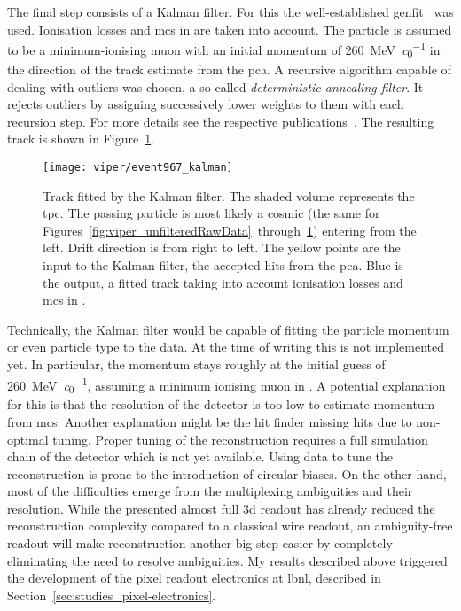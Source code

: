 The final step consists of a Kalman filter.
For this the well-established \gls{genfit}~\cite{genfit1, genfit2} was used.
Ionisation losses and \gls{mcs} in \lar{} are taken into account.
The particle is assumed to be a minimum-ionising muon with an initial momentum of \SI{260}{\mega\electronvolt\per\clight} in the direction of the track estimate from the \gls{pca}.
A recursive algorithm capable of dealing with outliers was chosen, a so-called \emph{deterministic annealing filter}.
It rejects outliers by assigning successively lower weights to them with each recursion step.
For more details see the respective publications~\cite{genfit1, genfit2}.
The resulting track is shown in Figure~\ref{fig:viper_kalman}.

\begin{figure}[htb]
	\centering
	\texttt{[image: viper/event967\_kalman]}
	\caption[Kalman-fitted track of typical pixel demonstrator event]{%
		Track fitted by the Kalman filter.
		The shaded volume represents the \acrshort{tpc}.
		The passing particle is most likely a cosmic \Pgm (the same for Figures~\ref{fig:viper_unfilteredRawData}~through~\ref{fig:viper_kalman}) entering from the left.
		Drift direction is from right to left.
		The yellow points are the input to the Kalman filter, the accepted hits from the \acrshort{pca}.
		Blue is the output, a fitted track taking into account ionisation losses and \acrshort{mcs} in \lar{}.
	}
	\label{fig:viper_kalman}
\end{figure}

Technically, the Kalman filter would be capable of fitting the particle momentum or even particle type to the data.
At the time of writing this is not implemented yet.
In particular, the momentum stays roughly at the initial guess of \SI{260}{\mega\electronvolt\per\clight}, assuming a minimum ionising muon in \lar{}.
A potential explanation for this is that the resolution of the detector is too low to estimate momentum from \gls{mcs}.
Another explanation might be the hit finder missing hits due to non-optimal tuning.
Proper tuning of the reconstruction requires a full simulation chain of the detector which is not yet available.
Using data to tune the reconstruction is prone to the introduction of circular biases.
On the other hand, most of the difficulties emerge from the multiplexing ambiguities and their resolution.
While the presented almost full \gls{3d} readout has already reduced the reconstruction complexity compared to a classical wire readout, an ambiguity-free readout will make reconstruction another big step easier by completely eliminating the need to resolve ambiguities.
My results described above triggered the development of the \larpix{} pixel readout electronics at \gls{lbnl}, described in Section~\ref{sec:studies_pixel-electronics}.


